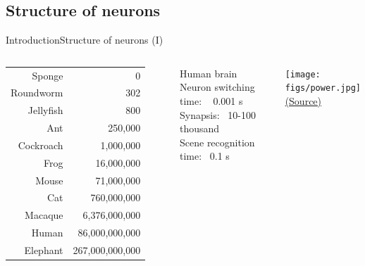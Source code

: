 \documentclass[10pt,compress]{beamer} %
\begin{document}
\subsection{Structure of neurons}
\begin{frame}{Introduction}{Structure of neurons (I)}
    \vspace{-0.3cm}
    \begin{columns}
		\begin{tabular}{r|r}\hline
		\sc{Animal} & \sc{Neurons} \\\hline
		Sponge & 0 \\
		Roundworm & 302 \\
		Jellyfish & 800 \\
		Ant & 250,000 \\
		Cockroach & 1,000,000 \\
		Frog & 16,000,000 \\
		Mouse & 71,000,000 \\
		Cat & 760,000,000 \\
		Macaque & 6,376,000,000 \\
		Human & 86,000,000,000 \\
		Elephant & 267,000,000,000 \\\hline
		\end{tabular}

	   \begin{block}{Human brain}
		Neuron switching time: ~ 0.001 s\\
  		Synapsis: ~10-100 thousand\\
   		Scene recognition time: ~0.1 s
	\end{block}

    \begin{center}
	        \texttt{[image: figs/power.jpg]}\\
	        \tiny{\href{http://www.sjef.nu/a-basic-introduction-to-singularity-skepticism/}{(Source)}}
	\end{center}
    \end{columns}
\end{frame}
\end{document}
